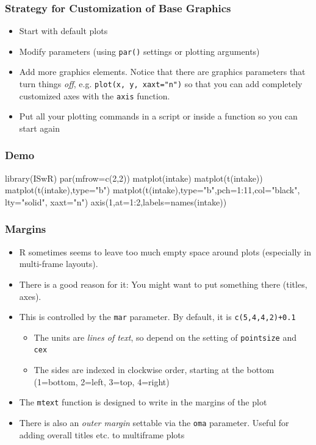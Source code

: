 \documentclass[xcolor=svgnames]{beamer}
\newcommand{\code}[1]{\texttt{#1}}
\let\overbatim\verbatim
\let\endoverbatim\endverbatim
\newenvironment{vcode}%
{\bgroup\baselineskip=0.8\baselineskip\overbatim}%
{\endoverbatim\egroup}
\newcounter{demo}
\newcommand{\Demo}{\stepcounter{demo}\frametitle{Demo \arabic{demo}}}
\begin{document}
\begin{frame}
  \frametitle{Strategy for Customization of Base Graphics}
  \begin{itemize}
  \item Start with default plots
  \item Modify parameters (using \code{par()} settings or plotting
      arguments)
  \item Add more graphics elements. Notice that there are graphics
      parameters that turn things \emph{off}, e.g.
      \code{plot(x, y, xaxt="n")} so that you can add
      completely customized axes with the \code{axis} function.
  \item Put all your plotting commands in a script or inside a function
      so you can start again
  \end{itemize}
\end{frame}

\begin{frame}[fragile]
  \Demo
\begin{vcode}
library(ISwR)
par(mfrow=c(2,2))
matplot(intake)
matplot(t(intake))
matplot(t(intake),type="b")
matplot(t(intake),type="b",pch=1:11,col="black",
        lty="solid", xaxt="n")
axis(1,at=1:2,labels=names(intake))
\end{vcode}
\end{frame}

\begin{frame}
  \frametitle{Margins}
  \begin{itemize}
  \item R sometimes seems to leave too much empty space around plots
    (especially in multi-frame layouts).
  \item There is a good reason for it: You might want to put something
    there (titles, axes).
  \item This is controlled by the \code{mar} parameter. By default, it is
    \code{c(5,4,4,2)+0.1}
    \begin{itemize}
      \item The units are \emph{lines of text}, so depend on the setting of
      \code{pointsize} and \code{cex}
      \item The sides are indexed in clockwise order, starting at the bottom
      (1=bottom, 2=left, 3=top, 4=right)
      \end{itemize}   
  \item The \code{mtext} function is designed to write in the margins
    of the plot
  \item There is also an \emph{outer margin} settable via the
    \code{oma} parameter. Useful for adding overall titles etc. to
    multiframe plots
  \end{itemize}
\end{frame}
\end{document}
